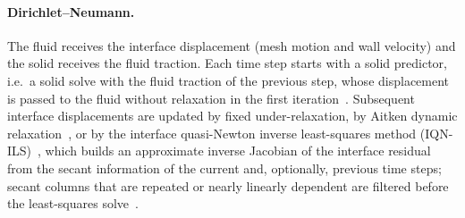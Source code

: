 \paragraph{Dirichlet--Neumann.}
The fluid receives the interface displacement (mesh motion and wall velocity) and the solid receives the fluid traction.
Each time step starts with a solid predictor, i.e.\ a solid solve with the fluid traction of the previous step, whose displacement is passed to the fluid without relaxation in the first iteration~\citep{Tukovic2018}.
Subsequent interface displacements are updated by fixed under-relaxation, by Aitken dynamic relaxation~\citep{kuttler2008fixed}, or by the interface quasi-Newton inverse least-squares method (IQN-ILS)~\citep{Degroote2009, Degroote2013}, which builds an approximate inverse Jacobian of the interface residual from the secant information of the current and, optionally, previous time steps; secant columns that are repeated or nearly linearly dependent are filtered before the least-squares solve~\citep{Haelterman2016}.

